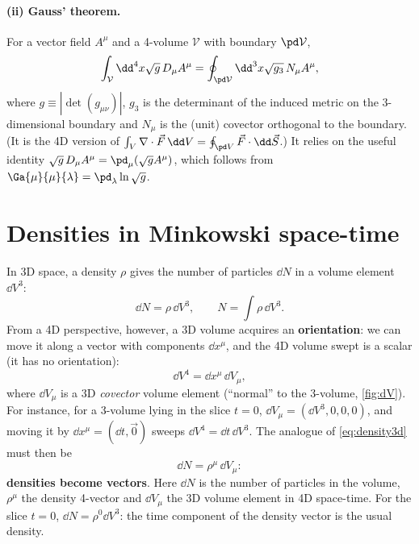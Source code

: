 \paragraph{(ii) Gauss' theorem.} For a vector field $A^\mu$ and a 4-volume $\mathcal V$ with boundary $\pd\mathcal V$,
\begin{equation}
  \int_{\mathcal V}\dd^4x\sqrt{g}\,D_\mu A^\mu=\oint_{\pd\mathcal V}\dd^3x\sqrt{g_3}\,N_\mu A^\mu ,
\end{equation}
where $g\equiv|\det(g_{\mu\nu})|$, $g_3$ is the determinant of the induced metric on the 3-dimensional boundary and $N_\mu$ is the (unit) covector orthogonal to the boundary. (It is the 4D version of $\int_V\nabla\cdot\vec F\,\dd V=\oint_{\pd V}\vec F\cdot\dd\vec S$.) It relies on the useful identity $\sqrt g\,D_\mu A^\mu=\pd_\mu(\sqrt g A^\mu)$, which follows from $\Ga{\mu}{\mu}{\lambda}=\pd_\lambda\ln\sqrt g$.

\section{Densities in Minkowski space-time}

In 3D space, a density $\rho$ gives the number of particles $\dd N$ in a volume element $\dd V^3$:
\begin{equation}
  \dd N=\rho\,\dd V^3,\qquad N=\int\rho\,\dd V^3 .
  \label{eq:density3d}
\end{equation}
From a 4D perspective, however, a 3D volume acquires an \textbf{orientation}: we can move it along a vector with components $\dd x^\mu$, and the 4D volume swept is a scalar (it has no orientation):
\begin{equation}
  \dd V^4=\dd x^\mu\,\dd V_\mu ,
\end{equation}
where $\dd V_\mu$ is a 3D \emph{covector} volume element (``normal'' to the 3-volume, \cref{fig:dV}). For instance, for a 3-volume lying in the slice $t=0$, $\dd V_\mu=(\dd V^3,0,0,0)$, and moving it by $\dd x^\mu=(\dd t,\vec 0)$ sweeps $\dd V^4=\dd t\,\dd V^3$. The analogue of \eqref{eq:density3d} must then be
\begin{equation}
  \boxed{\dd N=\rho^\mu\,\dd V_\mu}:
\end{equation}
\textbf{densities become vectors}. Here $\dd N$ is the number of particles in the volume, $\rho^\mu$ the density 4-vector and $\dd V_\mu$ the 3D volume element in 4D space-time. For the slice $t=0$, $\dd N=\rho^0\dd V^3$: the time component of the density vector is the usual density.

